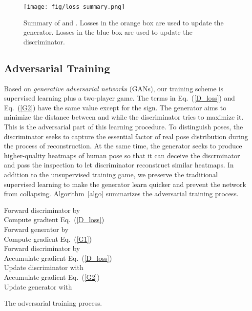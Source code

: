 \documentclass[10pt,twocolumn,letterpaper]{article}
\begin{document}
\begin{figure*}[tb]
    \centering
    \texttt{[image: fig/loss\_summary.png]}
    \caption{ Summary of  and . Losses in the orange box are used to update the generator. Losses in the blue box are used to update the discriminator.}
    \label{fig:loss_summary}
\end{figure*}



\subsection{Adversarial Training}

Based on {\em generative adversarial networks} (GANs), our training scheme is supervised learning plus a two-player game. The terms  in Eq.~(\ref{D_loss}) and Eq.~(\ref{G2}) have the same value except for the sign. The generator aims to minimize the distance between  and  while the discriminator tries to maximize it. This is the adversarial part of this learning procedure. To distinguish poses, the discriminator seeks to capture the essential factor of real pose distribution during the process of reconstruction. At the same time, the generator seeks to produce higher-quality heatmaps of human pose so that it can deceive the discrminator and pass the inspection to let discriminator reconstruct similar heatmaps. In addition to the unsupervised training game, we preserve the traditional supervised learning to make the generator learn quicker and prevent the network from collapsing. Algorithm~\ref{algo} summarizes the adversarial training process.


\begin{algorithm}
    {
      Forward discriminator by  
      \\ Compute gradient  \wrt Eq.~(\ref{D_loss})
      \\ Forward generator by  
      \\ Compute gradient  \wrt Eq.~(\ref{G1})
      \\ Forward discriminator by 
      \\ Accumulate gradient  \wrt Eq.~(\ref{D_loss})
	  \\ Update discriminator with 
      \\ Accumulate gradient  \wrt Eq.~(\ref{G2})
	  \\ Update generator with 
    }
    \caption{The adversarial training process.}
    \label{algo}
\end{algorithm}
\end{document}
